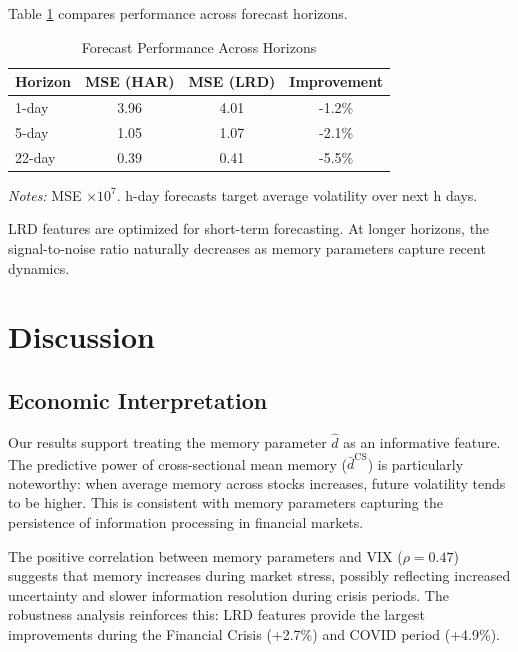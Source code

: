 \documentclass[12pt,a4paper]{article}
\begin{document}
Table \ref{tab:horizons} compares performance across forecast horizons.

\begin{table}[H]
\centering
\caption{Forecast Performance Across Horizons}
\label{tab:horizons}
\small
\begin{tabular}{lccc}
\toprule
Horizon & MSE (HAR) & MSE (LRD) & Improvement \\
\midrule
1-day & 3.96 & 4.01 & -1.2\% \\
5-day & 1.05 & 1.07 & -2.1\% \\
22-day & 0.39 & 0.41 & -5.5\% \\
\bottomrule
\end{tabular}
\begin{tablenotes}\small
\item \textit{Notes:} MSE $\times 10^7$. h-day forecasts target average volatility over next h days.
\end{tablenotes}
\end{table}

LRD features are optimized for short-term forecasting. At longer horizons, the signal-to-noise ratio naturally decreases as memory parameters capture recent dynamics.

\section{Discussion}
\label{sec:discussion}

\subsection{Economic Interpretation}

Our results support treating the memory parameter $\hat{d}$ as an informative feature. The predictive power of cross-sectional mean memory ($\bar{d}^{\text{CS}}$) is particularly noteworthy: when average memory across stocks increases, future volatility tends to be higher. This is consistent with memory parameters capturing the persistence of information processing in financial markets.

The positive correlation between memory parameters and VIX ($\rho = 0.47$) suggests that memory increases during market stress, possibly reflecting increased uncertainty and slower information resolution during crisis periods. The robustness analysis reinforces this: LRD features provide the largest improvements during the Financial Crisis (+2.7\%) and COVID period (+4.9\%).
\end{document}
